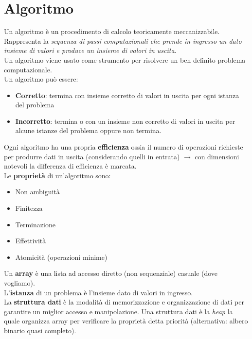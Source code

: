\documentclass[12pt,a4paper]{article}
\begin{document}
\section{Algoritmo}
Un algoritmo è un procedimento di calcolo teoricamente meccanizzabile. Rappresenta la \textsl{sequenza di passi computazionali che prende in ingresso un dato insieme di valori e produce un insieme di valori in uscita}.\\
Un algoritmo viene usato come strumento per risolvere un ben definito problema computazionale.\\
Un algoritmo può essere:\begin{itemize}
\item \textbf{Corretto}: termina con insieme corretto di valori in uscita per ogni istanza del problema
\item \textbf{Incorretto}: termina o con un insieme non corretto di valori in uscita per alcune istanze del problema oppure non termina.
\end{itemize}
Ogni algoritmo ha una propria \textbf{efficienza} ossia il numero di operazioni richieste per produrre dati in uscita (considerando quelli in entrata) $\rightarrow$ con dimensioni notevoli la differenza di efficienza è marcata.\\
Le \textbf{proprietà} di un'algoritmo sono:
\begin{itemize}
\item Non ambiguità
\item Finitezza
\item Terminazione
\item Effettività
\item Atomicità (operazioni minime)
\end{itemize}

\SmallSep \noindent
Un \textbf{array} è una lista ad accesso diretto (non sequenziale) casuale (dove vogliamo).\\
L'\textbf{istanza} di un problema è l'insieme dato di valori in ingresso.\\
La \textbf{struttura dati} è la modalità di memorizzazione e organizzazione di dati per garantire un miglior accesso e manipolazione. Una struttura dati è la \textsl{heap} la quale organizza array per verificare la proprietà detta priorità (alternativa: albero binario quasi completo).

\clearpage
\end{document}
